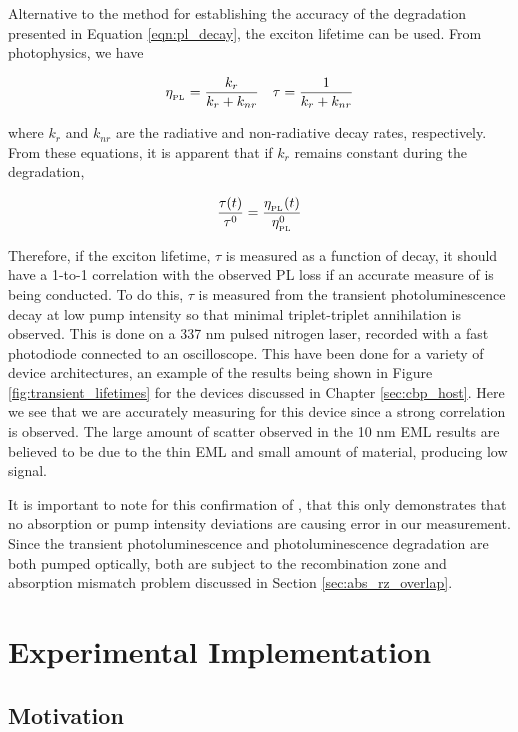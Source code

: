 \documentclass[../thesis.tex]{subfiles}
\begin{document}
Alternative to the method for establishing the accuracy of the \pl degradation presented in Equation \ref{eqn:pl_decay}, the exciton lifetime can be used.
From photophysics, we have

\begin{align}
\eta_{_\text{\tiny PL}}=\frac{k_r}{k_r+k_{nr}} && \tau=\frac{1}{k_r+k_{nr}}
\label{eqn:tau_pleff}
\end{align}

where $k_r$ and $k_{nr}$ are the radiative and non-radiative decay rates, respectively.
From these equations, it is apparent that if $k_r$ remains constant during the degradation, 

     \[\frac{\tau(t)}{\tau^0}=\frac{\eta_{_\text{\tiny PL}}(t)}{\eta_{_\text{\tiny PL}}^0}\]


Therefore, if the exciton lifetime, $\tau$ is measured as a function of decay, it should have a 1-to-1 correlation with the observed PL loss if an accurate measure of \pl is being conducted.  
To do this, $\tau$ is measured from the transient photoluminescence decay at low pump intensity so that minimal triplet-triplet annihilation is observed. 
This is done on a 337 nm pulsed nitrogen laser, recorded with a fast photodiode connected to an oscilloscope.
This have been done for a variety of device architectures, an example of the results being shown in Figure \ref{fig:transient_lifetimes} for the devices discussed in Chapter \ref{sec:cbp_host}.
Here we see that we are accurately measuring \pl for this device since a strong correlation is observed.  
The large amount of scatter observed in the 10 nm EML results are believed to be due to the thin EML and small amount of material, producing low signal.

It is important to note for this confirmation of \pl, that this only demonstrates that no absorption or pump intensity deviations are causing error in our measurement.
Since the transient photoluminescence and photoluminescence degradation are both pumped optically, both are subject to the recombination zone and absorption mismatch problem discussed in Section \ref{sec:abs_rz_overlap}.



\section{Experimental Implementation}

\subsection{Motivation}
\end{document}
